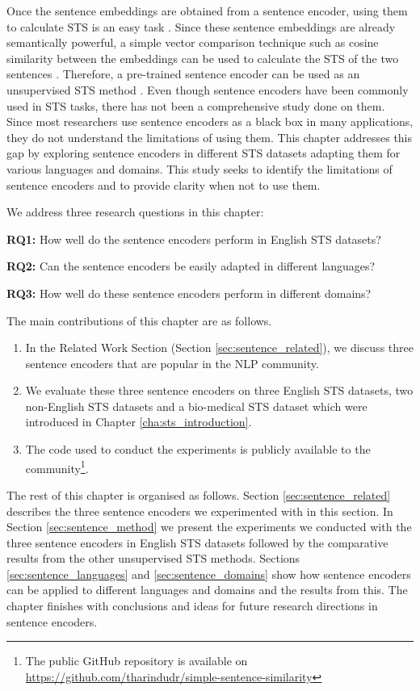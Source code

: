 Once the sentence embeddings are obtained from a sentence encoder, using them to calculate STS is an easy task \autocite{pagliardini-etal-2018-unsupervised}. Since these sentence embeddings are already semantically powerful, a simple vector comparison technique such as cosine similarity between the embeddings can be used to calculate the STS of the two sentences \autocite{conneau-kiela-2018-senteval}. Therefore, a pre-trained sentence encoder can be used as an unsupervised STS method \autocite{ranasinghe-etal-2019-enhancing}. Even though sentence encoders have been commonly used in STS tasks, there has not been a comprehensive study done on them. Since most researchers use sentence encoders as a black box in many applications, they do not understand the limitations of using them. This chapter addresses this gap by exploring sentence encoders in different STS datasets adapting them for various languages and domains. This study seeks to identify the limitations of sentence encoders and to provide clarity when not to use them. 

We address three research questions in this chapter:

\textbf{RQ1:} How well do the sentence encoders perform in English STS datasets?

\textbf{RQ2:} Can the sentence encoders be easily adapted in different languages?

\textbf{RQ3:} How well do these sentence encoders perform in different domains?

The main contributions of this chapter are as follows.

\begin{enumerate}
	\item In the Related Work Section (Section \ref{sec:sentence_related}), we discuss three sentence encoders that are popular in the NLP community. 
	
	\item  We evaluate these three sentence encoders on three English STS datasets, two non-English STS datasets and a bio-medical STS dataset which were introduced in Chapter \ref{cha:sts_introduction}.
	
	\item The code used to conduct the experiments is publicly available to the community\footnote{The public GitHub repository is available on \url{https://github.com/tharindudr/simple-sentence-similarity}}.
	
\end{enumerate}

The rest of this chapter is organised as follows. Section \ref{sec:sentence_related} describes the three sentence encoders we experimented with in this section. In Section \ref{sec:sentence_method} we present the experiments we conducted with the three sentence encoders in English STS datasets followed by the comparative results from the other unsupervised STS methods. Sections \ref{sec:sentence_languages} and \ref{sec:sentence_domains} show how sentence encoders can be applied to different languages and domains and the results from this. The chapter finishes with conclusions and ideas for future research directions in sentence encoders.


